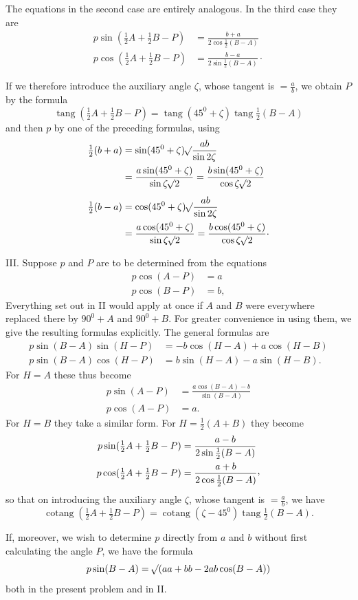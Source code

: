 The equations in the second case are entirely analogous. In the third case they are
\[
\begin{aligned}
p\sin(\tfrac{1}{2}A+\tfrac{1}{2}B-P)&=\frac{b+a}{2\cos\tfrac{1}{2}(B-A)}\\
p\cos(\tfrac{1}{2}A+\tfrac{1}{2}B-P)&=\frac{b-a}{2\sin\tfrac{1}{2}(B-A)}\mathpunct{\cdot}
\end{aligned}
\]
\par
If we therefore introduce the auxiliary angle $\zeta$, whose tangent is $=\frac{a}{b}$, we obtain $P$ by the formula
\[
\operatorname{tang}(\tfrac{1}{2}A+\tfrac{1}{2}B-P)=\operatorname{tang}(45^0+\zeta)\operatorname{tang}\tfrac{1}{2}(B-A)
\]
and then $p$ by one of the preceding formulas, using
\[
\begin{aligned}
\tfrac{1}{2}(b+a)&=\sin(45^0+\zeta)\mathord{{}^{}\!\surd}\frac{ab}{\sin2\zeta}\\
&=\frac{a\sin(45^0+\zeta)}{\sin\zeta\mathord{{}^{}\!\surd}2}=\frac{b\sin(45^0+\zeta)}{\cos\zeta\mathord{{}^{}\!\surd}2}\\[.4em]
\tfrac{1}{2}(b-a)&=\cos(45^0+\zeta)\mathord{{}^{}\!\surd}\frac{ab}{\sin2\zeta}\\
&=\frac{a\cos(45^0+\zeta)}{\sin\zeta\mathord{{}^{}\!\surd}2}=\frac{b\cos(45^0+\zeta)}{\cos\zeta\mathord{{}^{}\!\surd}2}\mathpunct{\cdot}
\end{aligned}
\]
\par
III. Suppose $p$ and $P$ are to be determined from the equations
\[
\begin{aligned}
p\cos(A-P)&=a\\
p\cos(B-P)&=b,
\end{aligned}
\]
Everything set out in II would apply at once if $A$ and $B$ were everywhere replaced there by $90^0+A$ and $90^0+B$. For greater convenience in using them, we give the resulting formulas explicitly. The general formulas are
\[
\begin{aligned}
p\sin(B-A)\sin(H-P)&=-b\cos(H-A)+a\cos(H-B)\\
p\sin(B-A)\cos(H-P)&=b\sin(H-A)-a\sin(H-B).
\end{aligned}
\]
For $H=A$ these thus become
\[
\begin{aligned}
p\sin(A-P)&=\frac{a\cos(B-A)-b}{\sin(B-A)}\\
p\cos(A-P)&=a.
\end{aligned}
\]
For $H=B$ they take a similar form. For $H=\tfrac{1}{2}(A+B)$ they become
\[
\begin{aligned}
p\sin(\tfrac{1}{2}A+\tfrac{1}{2}B-P)&=\frac{a-b}{2\sin\tfrac{1}{2}(B-A)}\\
p\cos(\tfrac{1}{2}A+\tfrac{1}{2}B-P)&=\frac{a+b}{2\cos\tfrac{1}{2}(B-A)}\mathpunct{\raisebox{.45ex}{,}}
\end{aligned}
\]
so that on introducing the auxiliary angle $\zeta$, whose tangent is $=\frac{a}{b}$, we have
\[
\operatorname{cotang}(\tfrac{1}{2}A+\tfrac{1}{2}B-P)=\operatorname{cotang}(\zeta-45^0)\operatorname{tang}\tfrac{1}{2}(B-A).
\]
\par
If, moreover, we wish to determine $p$ directly from $a$ and $b$ without first calculating the angle $P$, we have the formula
\[
p\sin(B-A)=\mathord{{}^{}\!\surd}(aa+bb-2ab\cos(B-A))
\]
both in the present problem and in II.
